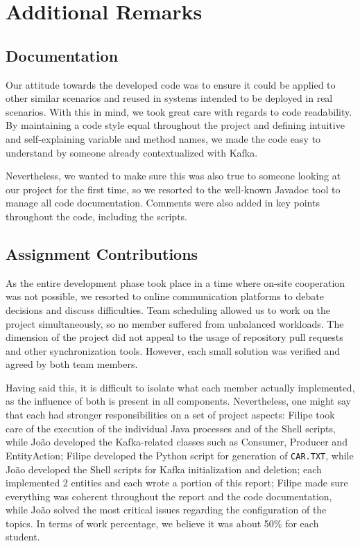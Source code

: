 \documentclass[12pt]{article}
\begin{document}
\newpage
\section{Additional Remarks} %

\subsection{Documentation} %

Our attitude towards the developed code was to ensure it could be applied to other similar scenarios and reused in systems intended to be deployed in real scenarios.
With this in mind, we took great care with regards to code readability.
By maintaining a code style equal throughout the project and defining intuitive and self-explaining variable and method names, we made the code easy to understand
by someone already contextualized with Kafka.

Nevertheless, we wanted to make sure this was also true to someone looking at our project for the first time, so we resorted to the well-known Javadoc 
\cite{javadoc} tool to manage all code documentation.
Comments were also added in key points throughout the code, including the scripts.

\subsection{Assignment Contributions} %

As the entire development phase took place in a time where on-site cooperation was not possible, we resorted to online communication platforms to debate decisions
and discuss difficulties.
Team scheduling allowed us to work on the project simultaneously, so no member suffered from unbalanced workloads.
The dimension of the project did not appeal to the usage of repository pull requests and other synchronization tools.
However, each small solution was verified and agreed by both team members.

Having said this, it is difficult to isolate what each member actually implemented, as the influence of both is present in all components.
Nevertheless, one might say that each had stronger responsibilities on a set of project aspects:
Filipe took care of the execution of the individual Java processes and of the Shell scripts, while João developed the Kafka-related classes such as Consumer,
Producer and EntityAction; Filipe developed the Python script for generation of \texttt{CAR.TXT}, while João developed the Shell scripts for Kafka initialization 
and deletion; each implemented 2 entities and each wrote a portion of this report; Filipe made sure everything was coherent throughout the report and the code 
documentation, while João solved the most critical issues regarding the configuration of the topics.
In terms of work percentage, we believe it was about 50\% for each student.
\end{document}
